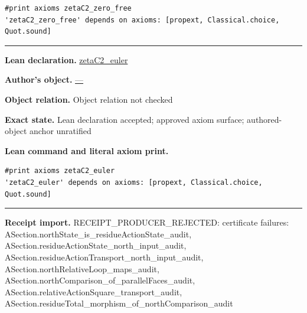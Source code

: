 \documentclass[11pt]{article}
\theoremstyle{plain}
\theoremstyle{definition}
\theoremstyle{remark}
\begin{document}
\begin{tcolorbox}
\begin{Verbatim}[breaklines=true,breakanywhere=true,fontsize=\small]
#print axioms zetaC2_zero_free
'zetaC2_zero_free' depends on axioms: [propext, Classical.choice, Quot.sound]
\end{Verbatim}
\medskip\hrule\medskip
\textbf{Lean declaration.} \url{zetaC2_euler}
\par\textbf{Author's object.} \url{—}
\par\textbf{Object relation.} Object relation not checked
\par\textbf{Exact state.} Lean declaration accepted; approved axiom surface; authored-object anchor unratified
\par\smallskip\textbf{Lean command and literal axiom print.}
\begin{Verbatim}[breaklines=true,breakanywhere=true,fontsize=\small]
#print axioms zetaC2_euler
'zetaC2_euler' depends on axioms: [propext, Classical.choice, Quot.sound]
\end{Verbatim}
\medskip\hrule\medskip
\textbf{Receipt import.} \textcolor{KgtRed}{RECEIPT\_PRODUCER\_REJECTED: certificate failures: ASection.northState\_is\_residueActionState\_audit, ASection.residueActionState\_north\_input\_audit, ASection.residueActionTransport\_north\_input\_audit, ASection.northRelativeLoop\_maps\_audit, ASection.northComparison\_of\_parallelFaces\_audit, ASection.relativeActionSquare\_transport\_audit, ASection.residueTotal\_morphism\_of\_northComparison\_audit}
\end{tcolorbox}
\medskip
\end{document}
